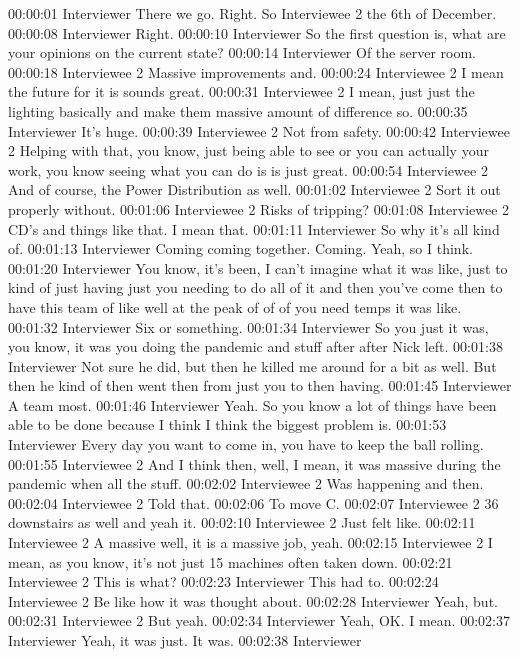 00:00:01 Interviewer
There we go. Right. So Interviewee 2 the 6th of December.
00:00:08 Interviewer
Right.
00:00:10 Interviewer
So the first question is, what are your opinions on the current state?
00:00:14 Interviewer
Of the server room.
00:00:18 Interviewee 2
Massive improvements and.
00:00:24 Interviewee 2 
I mean the future for it is sounds great.
00:00:31 Interviewee 2 
I mean, just just the lighting basically and make them massive amount of difference so.
00:00:35 Interviewer
It's huge.
00:00:39 Interviewee 2 
Not from safety.
00:00:42 Interviewee 2 
Helping with that, you know, just being able to see or you can actually your work, you know seeing what you can do is is just great.
00:00:54 Interviewee 2 
And of course, the Power Distribution as well.
00:01:02 Interviewee 2 
Sort it out properly without.
00:01:06 Interviewee 2 
Risks of tripping?
00:01:08 Interviewee 2 
CD's and things like that. I mean that.
00:01:11 Interviewer
So why it's all kind of.
00:01:13 Interviewer
Coming coming together. Coming. Yeah, so I think.
00:01:20 Interviewer
You know, it's been, I can't imagine what it was like, just to kind of just having just you needing to do all of it and then you've come then to have this team of like well at the peak of of of you need temps it was like.
00:01:32 Interviewer
Six or something.
00:01:34 Interviewer
So you just it was, you know, it was you doing the pandemic and stuff after after Nick left.
00:01:38 Interviewer
Not sure he did, but then he killed me around for a bit as well. But then he kind of then went then from just you to then having.
00:01:45 Interviewer
A team most.
00:01:46 Interviewer
Yeah. So you know a lot of things have been able to be done because I think I think the biggest problem is.
00:01:53 Interviewer
Every day you want to come in, you have to keep the ball rolling.
00:01:55 Interviewee 2 
And I think then, well, I mean, it was massive during the pandemic when all the stuff.
00:02:02 Interviewee 2 
Was happening and then.
00:02:04 Interviewee 2 
Told that.
00:02:06
To move C.
00:02:07 Interviewee 2 
36 downstairs as well and yeah it.
00:02:10 Interviewee 2 
Just felt like.
00:02:11 Interviewee 2 
A massive well, it is a massive job, yeah.
00:02:15 Interviewee 2 
I mean, as you know, it's not just 15 machines often taken down.
00:02:21 Interviewee 2 
This is what?
00:02:23 Interviewer
This had to.
00:02:24 Interviewee 2 
Be like how it was thought about.
00:02:28 Interviewer
Yeah, but.
00:02:31 Interviewee 2 
But yeah.
00:02:34 Interviewer
Yeah, OK. I mean.
00:02:37 Interviewer
Yeah, it was just. It was.
00:02:38 Interviewer
